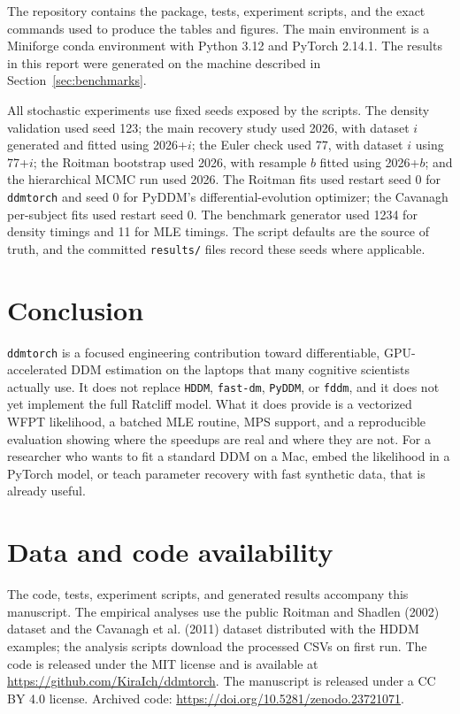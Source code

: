 \documentclass[11pt]{article}
\begin{document}
The repository contains the package, tests, experiment scripts, and the exact commands used to produce the tables and figures. The main environment is a Miniforge conda environment with Python 3.12 and PyTorch 2.14.1. The results in this report were generated on the machine described in Section~\ref{sec:benchmarks}.

All stochastic experiments use fixed seeds exposed by the scripts. The density validation used seed 123; the main recovery study used 2026, with dataset $i$ generated and fitted using 2026+$i$; the Euler check used 77, with dataset $i$ using 77+$i$; the Roitman bootstrap used 2026, with resample $b$ fitted using 2026+$b$; and the hierarchical MCMC run used 2026. The Roitman fits used restart seed 0 for \texttt{ddmtorch} and seed 0 for PyDDM's differential-evolution optimizer; the Cavanagh per-subject fits used restart seed 0. The benchmark generator used 1234 for density timings and 11 for MLE timings. The script defaults are the source of truth, and the committed \texttt{results/} files record these seeds where applicable.

\section{Conclusion}

\texttt{ddmtorch} is a focused engineering contribution toward differentiable, GPU-accelerated DDM estimation on the laptops that many cognitive scientists actually use. It does not replace \texttt{HDDM}, \texttt{fast-dm}, \texttt{PyDDM}, or \texttt{fddm}, and it does not yet implement the full Ratcliff model. What it does provide is a vectorized WFPT likelihood, a batched MLE routine, MPS support, and a reproducible evaluation showing where the speedups are real and where they are not. For a researcher who wants to fit a standard DDM on a Mac, embed the likelihood in a PyTorch model, or teach parameter recovery with fast synthetic data, that is already useful.

\section*{Data and code availability}

The code, tests, experiment scripts, and generated results accompany this manuscript.  The empirical analyses use the public Roitman and Shadlen (2002) dataset and the Cavanagh et al. (2011) dataset distributed with the HDDM examples; the analysis scripts download the processed CSVs on first run.  The code is released under the MIT license and is available at \url{https://github.com/KiraIch/ddmtorch}.  The manuscript is released under a CC BY 4.0 license.  Archived code: \url{https://doi.org/10.5281/zenodo.23721071}.
\end{document}
